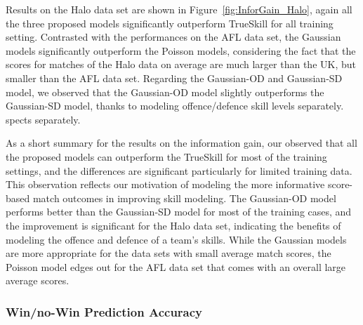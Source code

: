 \begin{center}
\begin{figure*}[htbp!]
 \centering
\caption{\small Results on the AFL data set, evaluated
using information gain. Error bars indicate
95\% confidence intervals.}
\label{fig:InforGain_AFL}
\end{figure*}
\end{center}

Results on the Halo data set are shown in Figure~\ref{fig:InforGain_Halo}, again all the three proposed models significantly outperform TrueSkill for all training setting. Contrasted with the performances on the AFL data set, the Gaussian models significantly outperform the Poisson models, considering the fact that the scores for matches of the Halo data on average are much larger than the UK, but smaller than the AFL data set. Regarding the Gaussian-OD and Gaussian-SD model, we observed that the Gaussian-OD model slightly outperforms the Gaussian-SD model, thanks to modeling offence/defence skill levels separately. 
spects separately. 

\begin{center}
\begin{figure*}[t!]
 \centering
\caption{\small Results on the Halo 2 data set, evaluated
using information gain. Error bars indicate
95\% confidence intervals.}
\label{fig:InforGain_Halo}
\end{figure*}
\end{center}

As a short summary for the results on the information gain, our observed that all the proposed models can outperform the TrueSkill for most of the training settings, and the differences are significant particularly for limited training data. This observation reflects our motivation of modeling the more informative score-based match outcomes in improving skill modeling. The Gaussian-OD model performs better than the Gaussian-SD model for most of the training cases, and the improvement is significant for the Halo data set, indicating the benefits of modeling the offence and defence of a team's skills. While the Gaussian models are more appropriate for the data sets with small average match scores, the Poisson model edges out for the AFL data set that comes with an overall large average scores. 

\subsubsection{Win/no-Win Prediction Accuracy }

